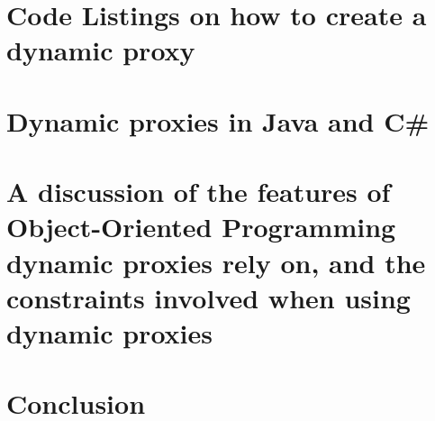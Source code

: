 \documentclass[10pt, onecolumn]{witseiepaper}
\begin{document}
\section{Code Listings on how to create a dynamic proxy}

\section{Dynamic proxies in Java and C\#}



\section{A discussion of the features of Object-Oriented Programming dynamic proxies rely on, and the constraints involved when using dynamic proxies}

\section{Conclusion}


\newpage



\end{document}
